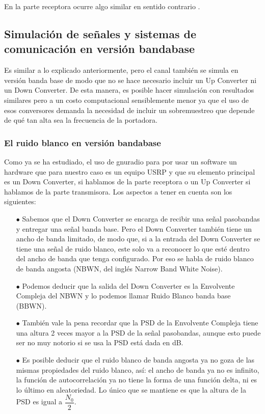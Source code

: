 En la parte receptora ocurre algo similar en sentido contrario . \\


\subsection{Simulación de señales y sistemas de comunicación en versión bandabase}

Es similar a lo explicado anteriormente, pero el canal también se simula en versión banda base de modo que no se hace necesario incluir un Up Converter ni un Down Converter. De esta manera, es posible hacer simulación con resultados similares pero a un costo computacional sensiblemente menor ya que el uso de esos conversores demanda la necesidad de incluir un sobremuestreo que depende de qué tan alta sea la frecuencia de la portadora.

\subsubsection{El ruido blanco en versión bandabase}
Como ya se ha estudiado, el uso de gnuradio para por usar un software un hardware que para nuestro caso es un equipo USRP y que su elemento principal es un Down Converter, si hablamos de la parte receptora o un Up Converter si hablamos de la parte transmisora. Los aspectos a tener en cuenta son los siguientes:

\begin{itemize}
	
	\item [$\bullet$] Sabemos que el Down Converter se encarga de recibir una señal pasobandas y entregar una señal banda base. Pero el Down Converter también tiene un ancho de banda limitado, de modo que, si a la entrada del Down Converter se tiene una señal de ruido blanco, este solo va a reconocer lo que esté dentro del ancho de banda que tenga configurado. Por eso se habla de ruido blanco de banda angosta (NBWN, del inglés Narrow Band White Noise).
	\item [$\bullet$] Podemos deducir que la salida del Down Converter es la Envolvente Compleja del NBWN y lo podemos llamar Ruido Blanco banda base (BBWN). 
	\item [$\bullet$] También vale la pena recordar que la PSD de la Envolvente Compleja tiene una altura 2 veces mayor a la PSD de la señal pasobandas, aunque esto puede ser no muy notorio si se usa la PSD está dada en dB.
	\item [$\bullet$] 	Es posible deducir que el ruido blanco de banda angosta ya no goza de las mismas propiedades del ruido blanco, así: el ancho de banda ya no es infinito, la función de autocorrelación ya no tiene la forma de una función delta, ni es lo último en aleatoriedad. Lo único que se mantiene es que la altura de la PSD es igual a $\dfrac{N_0}{2}$. 
\end{itemize}


